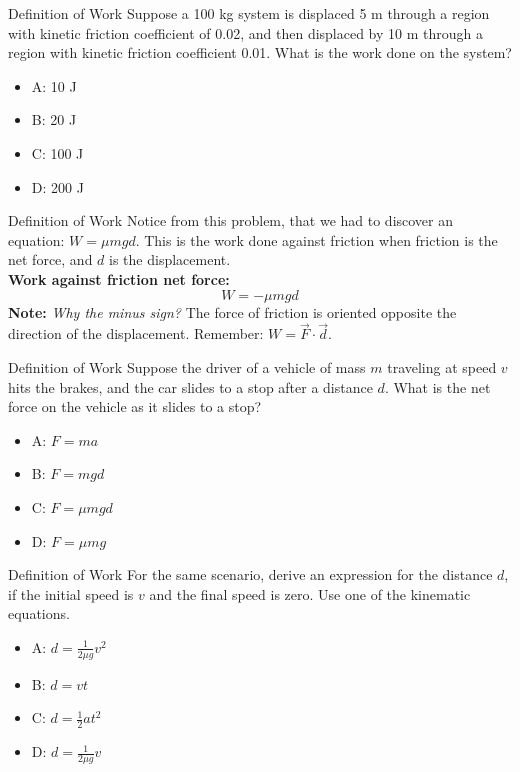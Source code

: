 \documentclass{beamer}
\begin{document}
\begin{frame}{Definition of Work}
Suppose a 100 kg system is displaced 5 m through a region with kinetic friction coefficient of 0.02, and then displaced by 10 m through a region with kinetic friction coefficient 0.01.  What is the work done on the system?
\begin{itemize}
\item A: 10 J
\item B: 20 J
\item C: 100 J
\item D: 200 J
\end{itemize}
\end{frame}

\begin{frame}{Definition of Work}
Notice from this problem, that we had to discover an equation: $W = \mu m g d$.  This is the work done against friction when friction is the net force, and $d$ is the displacement. \\ \vspace{1cm}
\textbf{Work against friction net force:}
\begin{equation}
W = -\mu m g d
\end{equation}
\textbf{Note:} \textit{Why the minus sign?} The force of friction is oriented opposite the direction of the displacement.  Remember: $W = \vec{F}\cdot\vec{d}$.
\end{frame}

\begin{frame}{Definition of Work}
Suppose the driver of a vehicle of mass $m$ traveling at speed $v$ hits the brakes, and the car slides to a stop after a distance $d$.  What is the net force on the vehicle as it slides to a stop?
\begin{itemize}
\item A: $F = ma$
\item B: $F = mgd$
\item C: $F = \mu m g d$
\item D: $F = \mu m g$
\end{itemize}
\end{frame}

\begin{frame}{Definition of Work}
For the same scenario, derive an expression for the distance $d$, if the initial speed is $v$ and the final speed is zero.  Use one of the kinematic equations.
\begin{itemize}
\item A: $d = \frac{1}{2\mu g} v^2$
\item B: $d = vt$
\item C: $d = \frac{1}{2}at^2$
\item D: $d = \frac{1}{2\mu g} v$
\end{itemize}
\end{frame}
\end{document}
